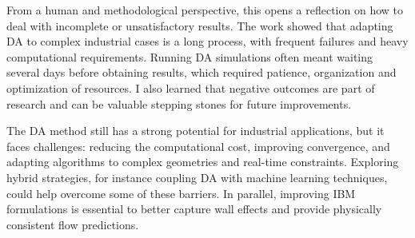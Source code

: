 From a human and methodological perspective, this opens a reflection on how to deal with incomplete or unsatisfactory results. The work showed that adapting DA to complex industrial cases is a long process, with frequent failures and heavy computational requirements. Running DA simulations often meant waiting several days before obtaining results, which required patience, organization and optimization of resources. I also learned that negative outcomes are part of research and can be valuable stepping stones for future improvements.

The DA method still has a strong potential for industrial applications, but it faces challenges: reducing the computational cost, improving convergence, and adapting algorithms to complex geometries and real-time constraints. Exploring hybrid strategies, for instance coupling DA with machine learning techniques, could help overcome some of these barriers. In parallel, improving IBM formulations is essential to better capture wall effects and provide physically consistent flow predictions.





